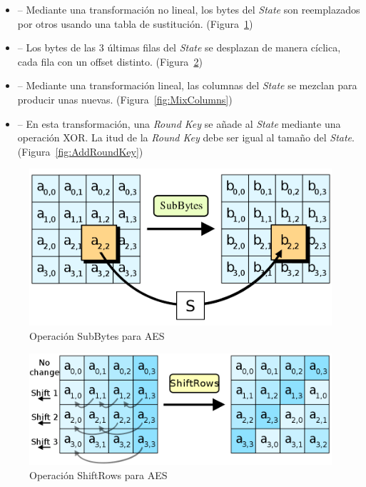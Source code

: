 \begin{itemize}
  \item {} -- Mediante una transformación no lineal,
  los bytes del \emph{State} son reemplazados por otros usando una tabla de sustitución.
  (Figura~\ref{fig:SubBytes})

  \item {} -- Los bytes de las 3 últimas filas del \emph{State}
  se desplazan de manera cíclica, cada fila con un offset distinto.
  (Figura~\ref{fig:ShiftRows})

  \item {} -- Mediante una transformación lineal,
  las columnas del \emph{State} se mezclan para producir unas nuevas.
  (Figura~\ref{fig:MixColumns})

  \item {} -- En esta transformación, una \emph{Round Key} se
  añade al \emph{State} mediante una operación XOR.
  La itud de la \emph{Round Key} debe ser igual al tamaño del \emph{State}.
  (Figura~\ref{fig:AddRoundKey})
\end{itemize}

\begin{figure}[ht]
  \centering
  \includegraphics[scale=0.25]{Figures/SubBytes}
  \decoRule
  \caption[SubBytes (AES)]{Operación SubBytes para AES \emph{\parencite{Reference27}}}
  \label{fig:SubBytes}
\end{figure}

\begin{figure}[ht]
  \centering
  \includegraphics[scale=0.25]{Figures/ShiftRows}
  \decoRule
  \caption[ShiftRows (AES)]{Operación ShiftRows para AES \emph{\parencite{Reference28}}}
  \label{fig:ShiftRows}
\end{figure}

